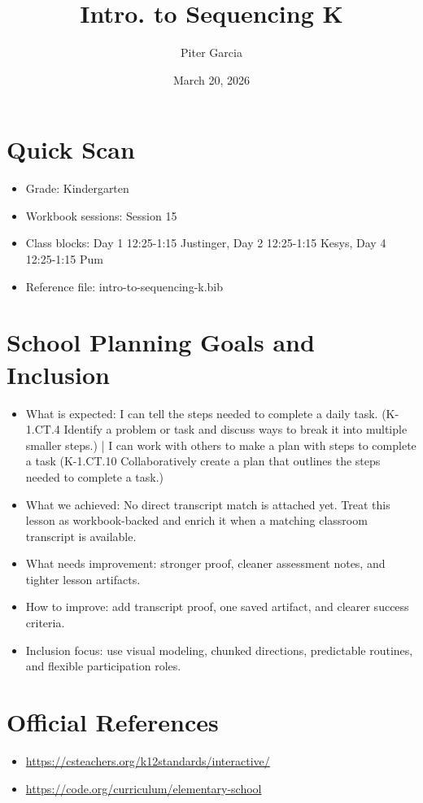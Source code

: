 \documentclass[11pt]{article}
\title{Intro. to Sequencing K}
\author{Piter Garcia}
\date{March 20, 2026}
\begin{document}
    \maketitle
    \section*{Quick Scan}
    \begin{itemize}[leftmargin=*]
    \item Grade: Kindergarten
    \item Workbook sessions: Session 15
    \item Class blocks: Day 1 12:25-1:15 Justinger, Day 2 12:25-1:15 Kesys, Day 4 12:25-1:15 Pum
    \item Reference file: intro-to-sequencing-k.bib
    \end{itemize}
    \section*{School Planning Goals and Inclusion}
    \begin{itemize}[leftmargin=*]
    \item What is expected: I can tell the steps needed to complete a daily task. (K-1.CT.4 Identify a problem or task and discuss ways to break it into multiple smaller steps.) | I can work with others to make a plan with steps to complete a task (K-1.CT.10 Collaboratively create a plan that outlines the steps needed to complete a task.)
    \item What we achieved: No direct transcript match is attached yet. Treat this lesson as workbook-backed and enrich it when a matching classroom transcript is available.
    \item What needs improvement: stronger proof, cleaner assessment notes, and tighter lesson artifacts.
    \item How to improve: add transcript proof, one saved artifact, and clearer success criteria.
    \item Inclusion focus: use visual modeling, chunked directions, predictable routines, and flexible participation roles.
    \end{itemize}
    \section*{Official References}
    \begin{itemize}[leftmargin=*]
    \item \url{https://csteachers.org/k12standards/interactive/}
\item \url{https://code.org/curriculum/elementary-school}

    \end{itemize}
    
\end{document}
